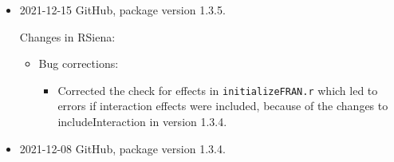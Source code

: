 \documentclass[a4paper,fleqn,11pt]{article}
\newcommand{\+}{\, + \,}
\newcommand{\sfn}[1]{\textsf{#1}}
\begin{document}
\begin{small}
\begin{itemize}
Changes in RSiena:
\begin{itemize}
\item  Effects:
\begin{itemize}
  \item New effects  \texttt{simAllNear}, \texttt{simAllFar}, \texttt{absOutDiffIntn}, \texttt{avDegIntn}.
  \item New effects \texttt{recipRateInv}, \texttt{recipRateLog} (contributed by Steffen Triebel).
  \item Default internal effect parameter for \texttt{outOutActIntn}, \texttt{outOutAvIntn},
    and \texttt{both} changed from 2 to 1.
\end{itemize}
\item Improvements of functionality:
\begin{itemize}
   \item Function \sfn{includeInteraction} now also can modify the \texttt{initialValue}
     of an effect; and the order of parameters for this function was changed,
     bringing it in line with \textsf{setEffect}.
   \item Small clarifications of help pages for \sfn{includeInteraction} and
     \textsf{setEffect}.
\end{itemize}

\end{itemize}

\item 2021-12-15 GitHub, package version 1.3.5.

Changes in RSiena:
\begin{itemize}
\item Bug corrections:
   \begin{itemize}
   \item Corrected the check for effects in  \texttt{initializeFRAN.r}
     which led to errors if interaction effects were included,
     because of the changes to \sfn{includeInteraction} in version 1.3.4.
    \end{itemize}
\end{itemize}


\item 2021-12-08 GitHub, package version 1.3.4.


\end{itemize}
\end{small}
\end{document}
